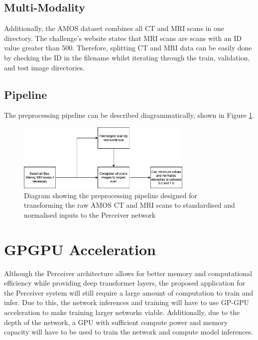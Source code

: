 \documentclass{l4proj}
\begin{document}
\subsection{Multi-Modality}

Additionally, the AMOS dataset combines all CT and MRI scans in one directory. The challenge’s website states that MRI scans are scans with an ID value greater than 500. Therefore, splitting CT and MRI data can be easily done by checking the ID in the filename whilst iterating through the train, validation, and test image directories.

\subsection{Pipeline}

The preprocessing pipeline can be described diagrammatically, shown in Figure \ref{fig:preprocessing_pipeline}.

\begin{figure}[htb] 
    \centering

     \includegraphics[width=0.75\textwidth]{images/preprocessing_pipeline.png}
     \caption{Diagram showing the preprocessing pipeline designed for transforming the raw AMOS CT and MRI scans to standardised and normalised inputs to the Perceiver network}
     \label{fig:preprocessing_pipeline}
\end{figure}

\section{GPGPU Acceleration} \label{sec:gpgpu_acceleration}

Although the Perceiver architecture allows for better memory and computational efficiency while providing deep transformer layers, the proposed application for the Perceiver system will still require a large amount of computation to train and infer. Due to this, the network inferences and training will have to use GP-GPU acceleration to make training larger networks viable. Additionally, due to the depth of the network, a GPU with sufficient compute power and memory capacity will have to be used to train the network and compute model inferences.
\end{document}
